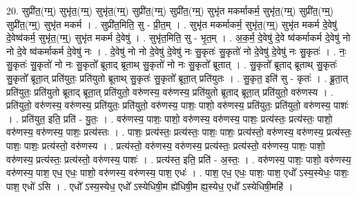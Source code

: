 \documentclass[17pt]{extarticle}
\begin{document}
20. सुप्री॑त॒(ग्म्॒) सुभृ॑त॒(ग्म्॒) सुभृ॑त॒(ग्म्॒) सुप्री॑त॒(ग्म्॒) सुप्री॑त॒(ग्म्॒) सुभृ॑त मकर्माकर्म॒ सुभृ॑त॒(ग्म्॒) सुप्री॑त॒(ग्म्॒) सुप्री॑त॒(ग्म्॒) सुभृ॑त मकर्म । . सुप्री॑त॒मिति॒ सु - प्री॒त॒म् । . सुभृ॑त मकर्माकर्म॒ सुभृ॑त॒(ग्म्॒) सुभृ॑त मकर्म दे॒वेषु॑ दे॒वेष्व॑कर्म॒ सुभृ॑त॒(ग्म्॒) सुभृ॑त मकर्म दे॒वेषु॑ । . सुभृ॑त॒मिति॒ सु - भृ॒त॒म् । . अ॒क॒र्म॒ दे॒वेषु॑ दे॒वे ष्व॑कर्माकर्म दे॒वेषु॑ नो नो दे॒वे ष्व॑कर्माकर्म दे॒वेषु॑ नः । . दे॒वेषु॑ नो नो दे॒वेषु॑ दे॒वेषु॑ नः सु॒कृतः॑ सु॒कृतो॑ नो दे॒वेषु॑ दे॒वेषु॑ नः सु॒कृतः॑ । . नः॒ सु॒कृतः॑ सु॒कृतो॑ नो नः सु॒कृतो᳚ ब्रूताद् ब्रूताथ् सु॒कृतो॑ नो नः सु॒कृतो᳚ ब्रूतात् । . सु॒कृतो᳚ ब्रूताद् ब्रूताथ् सु॒कृतः॑ सु॒कृतो᳚ ब्रूता॒त् प्रति॑युतः॒ प्रति॑युतो ब्रूताथ् सु॒कृतः॑ सु॒कृतो᳚ ब्रूता॒त् प्रति॑युतः । . सु॒कृत॒ इति॑ सु - कृतः॑ । . ब्रू॒ता॒त् प्रति॑युतः॒ प्रति॑युतो ब्रूताद् ब्रूता॒त् प्रति॑युतो॒ वरु॑णस्य॒ वरु॑णस्य॒ प्रति॑युतो ब्रूताद् ब्रूता॒त् प्रति॑युतो॒ वरु॑णस्य । . प्रति॑युतो॒ वरु॑णस्य॒ वरु॑णस्य॒ प्रति॑युतः॒ प्रति॑युतो॒ वरु॑णस्य॒ पाशः॒ पाशो॒ वरु॑णस्य॒ प्रति॑युतः॒ प्रति॑युतो॒ वरु॑णस्य॒ पाशः॑ । . प्रति॑युत॒ इति॒ प्रति॑ - यु॒तः॒ । . वरु॑णस्य॒ पाशः॒ पाशो॒ वरु॑णस्य॒ वरु॑णस्य॒ पाशः॒ प्रत्य॑स्तः॒ प्रत्य॑स्तः॒ पाशो॒ वरु॑णस्य॒ वरु॑णस्य॒ पाशः॒ प्रत्य॑स्तः । . पाशः॒ प्रत्य॑स्तः॒ प्रत्य॑स्तः॒ पाशः॒ पाशः॒ प्रत्य॑स्तो॒ वरु॑णस्य॒ वरु॑णस्य॒ प्रत्य॑स्तः॒ पाशः॒ पाशः॒ 
प्रत्य॑स्तो॒ वरु॑णस्य । . प्रत्य॑स्तो॒ वरु॑णस्य॒ वरु॑णस्य॒ प्रत्य॑स्तः॒ प्रत्य॑स्तो॒ वरु॑णस्य॒ पाशः॒ पाशो॒ वरु॑णस्य॒ प्रत्य॑स्तः॒ प्रत्य॑स्तो॒ वरु॑णस्य॒ पाशः॑ । . प्रत्य॑स्त॒ इति॒ प्रति॑ - अ॒स्तः॒ । . वरु॑णस्य॒ पाशः॒ पाशो॒ वरु॑णस्य॒ वरु॑णस्य॒ पाश॒ एध॒ एधः॒ पाशो॒ वरु॑णस्य॒ वरु॑णस्य॒ पाश॒ एधः॑ । . पाश॒ एध॒ एधः॒ पाशः॒ पाश॒ एधो᳚ ऽस्य॒स्येधः॒ पाशः॒ पाश॒ एधो॑ ऽसि । . एधो᳚ ऽस्य॒स्येध॒ एधो᳚ ऽस्येधिषी॒म ह्ये॑धिषी॒म ह्य॒स्येध॒ एधो᳚ ऽस्येधिषी॒महि॑ । \newline
\end{document}
